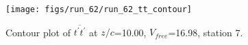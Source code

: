\begin{figure}[H]
\centering
\texttt{[image: figs/run\_62/run\_62\_tt\_contour]}
\caption{Contour plot of $\overline{t^\prime t^\prime}$ at $z/c$=10.00, $V_{free}$=16.98, station 7.}
\label{fig:run_62_tt_contour}
\end{figure}


